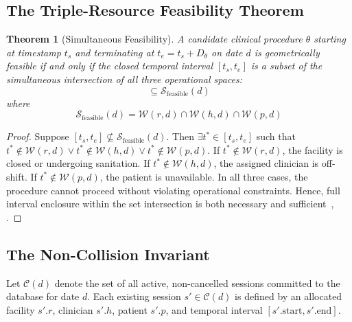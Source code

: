\documentclass[conference]{IEEEtran}
\newtheorem{theorem}{Theorem}
\begin{document}
\subsection{The Triple-Resource Feasibility Theorem}
\begin{theorem}[Simultaneous Feasibility]
A candidate clinical procedure $\theta$ starting at timestamp $t_s$ and terminating at $t_e = t_s + D_{\theta}$ on date $d$ is geometrically feasible if and only if the closed temporal interval $[t_s, t_e]$ is a subset of the simultaneous intersection of all three operational spaces:
\begin{equation}
[t_s, t_e] \subseteq \mathcal{S}_{\text{feasible}}(d)
\end{equation}
where
\begin{equation}
\mathcal{S}_{\text{feasible}}(d) = \mathcal{W}(r, d) \cap \mathcal{W}(h, d) \cap \mathcal{W}(p, d)
\end{equation}
\end{theorem}

\begin{proof}
Suppose $[t_s, t_e] \not\subseteq \mathcal{S}_{\text{feasible}}(d)$. Then $\exists t^* \in [t_s, t_e]$ such that $t^* \notin \mathcal{W}(r, d) \lor t^* \notin \mathcal{W}(h, d) \lor t^* \notin \mathcal{W}(p, d)$. If $t^* \notin \mathcal{W}(r, d)$, the facility is closed or undergoing sanitation. If $t^* \notin \mathcal{W}(h, d)$, the assigned clinician is off-shift. If $t^* \notin \mathcal{W}(p, d)$, the patient is unavailable. In all three cases, the procedure cannot proceed without violating operational constraints. Hence, full interval enclosure within the set intersection is both necessary and sufficient~\cite{allen1983maintaining}, \cite{golumbic2004algorithmic}.
\end{proof}

\subsection{The Non-Collision Invariant}
Let $\mathcal{C}(d)$ denote the set of all active, non-cancelled sessions committed to the database for date $d$. Each existing session $s' \in \mathcal{C}(d)$ is defined by an allocated facility $s'.r$, clinician $s'.h$, patient $s'.p$, and temporal interval $[s'.\text{start}, s'.\text{end}]$.
\end{document}
